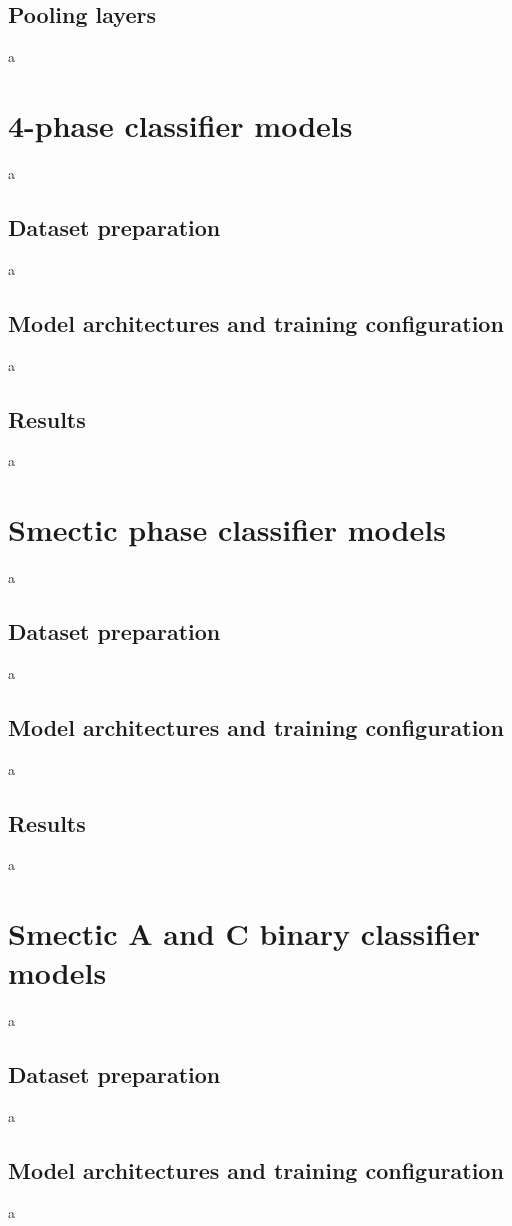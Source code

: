 \documentclass[12pt]{article}
\begin{document}
\subsection{Pooling layers}
a
\section{4-phase classifier models}
a
\subsection{Dataset preparation}
a
\subsection{Model architectures and training configuration}
a
\subsection{Results}
a
\section{Smectic phase classifier models}
a
\subsection{Dataset preparation}
a
\subsection{Model architectures and training configuration}
a
\subsection{Results}
a
\section{Smectic A and C binary classifier models}
a
\subsection{Dataset preparation}
a
\subsection{Model architectures and training configuration}
a
\end{document}
